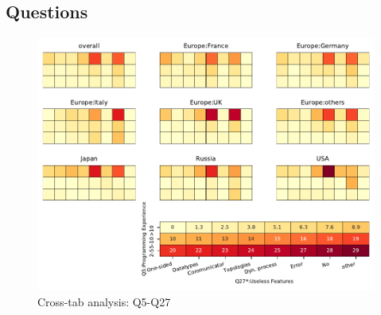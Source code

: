 
\subsection{Questions}


\begin{figure}
\begin{center}
\includegraphics[width=12cm]{../pdfs/Q5-Q27.pdf}
\caption{Cross-tab analysis: Q5-Q27}
\label{fig:Q5-Q27}
\end{center}
\end{figure}
